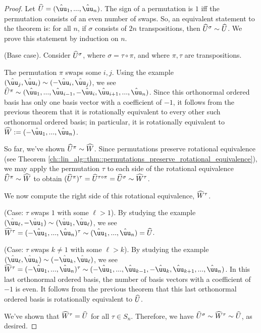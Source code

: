\begin{proof}
    Let $\hU = (\huu_1, ..., \huu_n)$. The sign of a permutation is $1$ iff the permutation consists of an even number of swaps. So, an equivalent statement to the theorem is: for all $n$, if $\sigma$ consists of $2n$ transpositions, then $\widehat{U}^\sigma \sim \widehat{U}$. We prove this statement by induction on $n$.
    
    (Base case). Consider $\widehat{U}^\sigma$, where $\sigma = \tau \circ \pi$, and where $\pi, \tau$ are transpositions. 
    
    The permutation $\pi$ swaps some $i, j$. Using the example $(\huu_j, \huu_i) \sim (-\huu_i, \huu_j)$, we see \\ $\hU^\pi \sim (\huu_1, ..., \huu_{i - 1}, -\huu_i, \huu_{i + 1}, ..., \huu_n)$. Since this orthonormal ordered basis has only one basis vector with a coefficient of $-1$, it follows from the previous theorem that it is rotationally equivalent to every other such orthonormal ordered basis; in particular, it is rotationally equivalent to $\hW :=  (-\huu_1, ..., \huu_n)$.

    So far, we've shown $\widehat{U}^\pi \sim \widehat{W}$. Since permutations preserve rotational equivalence (see Theorem \ref{ch::lin_alg::thm::permutations_preserve_rotational_equivalence}), we may apply the permutation $\tau$ to each side of the rotational equivalence $\widehat{U}^\pi \sim \widehat{W}$ to obtain $(\widehat{U}^\pi)^\tau = \widehat{U}^{\tau \circ \pi}  = \widehat{U}^\sigma \sim \widehat{W}^\tau$.

    We now compute the right side of this rotational equivalence, $\widehat{W}^\tau$.
    
    \indent \indent (Case: $\tau$ swaps $1$ with some $\ell > 1$). By studying the example $(\huu_\ell, -\huu_1) \sim (\huu_1, \huu_\ell)$, we see $\hW^\tau = (-\huu_1, ..., \huu_n)^\tau \sim (\huu_1, ..., \huu_n) = \hU$.
    
    \indent \indent (Case: $\tau$ swaps $k \neq 1$ with some $\ell > k$). By studying the example $(\huu_\ell, \huu_k) \sim (-\huu_k, \huu_\ell)$, we see $\hW^\tau = (-\huu_1, ..., \huu_n)^\tau \sim (-\huu_1, ..., \huu_{k - 1}, -\huu_k, \huu_{k + 1}, ..., \huu_n)$. In this last orthonormal ordered basis, the number of basis vectors with a coefficient of $-1$ is even. It follows from the previous theorem that this last orthonormal ordered basis is rotationally equivalent to $\widehat{U}$.

    We've shown that $\widehat{W}^\tau = \widehat{U}$ for all $\tau \in S_n$. Therefore, we have $\widehat{U}^\sigma \sim \widehat{W}^\tau \sim \widehat{U}$, as desired.
    

\end{proof}
